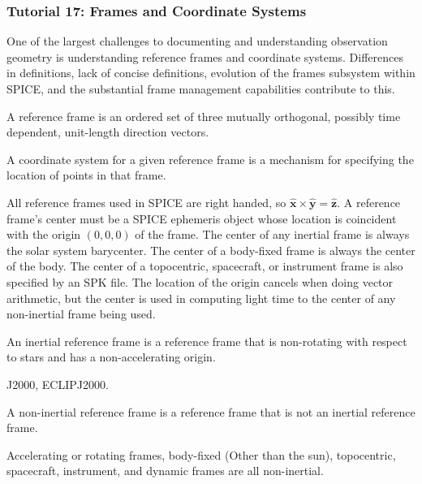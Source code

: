 \documentclass[crop=false,class=book]{standalone}
\begin{document}
\subsubsection{Tutorial 17: Frames and Coordinate Systems}
One of the largest challenges to documenting and understanding observation geometry is understanding reference frames and coordinate systems. Differences in definitions, lack of concise definitions, evolution of the frames subsystem within SPICE, and the substantial frame management capabilities contribute to this. 
\begin{definition}
A reference frame is an ordered set of three mutually orthogonal, possibly time dependent, unit-length direction vectors.
\end{definition}
\begin{definition}
A coordinate system for a given reference frame is a mechanism for specifying the location of points in that frame.
\end{definition}
All reference frames used in SPICE are right handed, so $\hat{\mathbf{x}}\times \hat{\mathbf{y}} = \hat{\mathbf{z}}$. A reference frame's center must be a SPICE ephemeris object whose location is coincident with the origin $(0,0,0)$ of the frame. The center of any inertial frame is always the solar system barycenter. The center of a body-fixed frame is always the center of the body. The center of a topocentric, spacecraft, or instrument frame is also specified by an SPK file. The location of the origin cancels when doing vector arithmetic, but the center is used in computing light time to the center of any non-inertial frame being used.
\begin{definition}
An inertial reference frame is a reference frame that is non-rotating with respect to stars and has a non-accelerating origin.
\end{definition}
\begin{example}
J2000, ECLIPJ2000.
\end{example}
\begin{definition}
A non-inertial reference frame is a reference frame that is not an inertial reference frame.
\end{definition}
\begin{example}
Accelerating or rotating frames, body-fixed (Other than the sun), topocentric, spacecraft, instrument, and dynamic frames are all non-inertial. 
\end{example}
\end{document}
